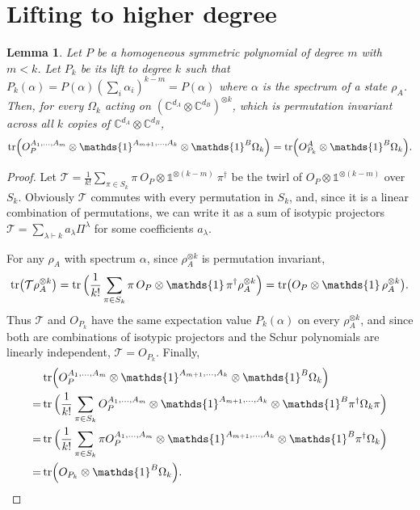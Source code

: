 \documentclass[11pt,a4paper]{report}
\newcommand{\one}{\mathds{1}}
\newcommand{\I}{\one}
\renewcommand{\a}{\alpha}
\newcommand{\C}{\mathds{C}}
\newtheorem{lemma}[theorem]{Lemma}
\begin{document}
\section{Lifting to higher degree}\label{sec:lifting}
\begin{lemma}\label{lem:lifting}
    Let $P$ be a homogeneous symmetric polynomial of degree $m$ with $m < k$. Let $P_k$ be its lift to degree $k$ such that $P_k(\a) = P(\a) \left(\sum_i \a_i \right)^{k-m} = P(\a)$ where $\a$ is the spectrum of a state $\rho_A$.
    Then, for every $\Omega_k$ acting on $(\C^{d_A} \otimes \C^{d_B})^{\otimes k}$, which is permutation invariant across all $k$ copies of $\C^{d_A} \otimes \C^{d_B}$,
    \begin{equation}
        \tr(O_P^{A_1,\dots, A_m} \otimes \I^{A_{m+1}, \dots, A_k} \otimes \I^{B} \Omega_k) = \tr(O_{P_k}^A \otimes \I^B \Omega_k).
    \end{equation}
\end{lemma}
\begin{proof}
    Let $\mathcal{T} = \frac{1}{k!}\sum_{\pi \in S_k} \pi \ O_P \otimes \I^{\otimes (k-m)} \ \pi^\dagger$ be the twirl of $O_P \otimes \I^{\otimes (k-m)}$ over $S_k$. Obviously $\mathcal{T}$ commutes with every permutation in $S_k$, and, since it is a linear combination of permutations, we can write it as a sum of isotypic projectors $\mathcal{T} = \sum_{\lambda \vdash k} a_\lambda \Pi^\lambda$ for some coefficients $a_\lambda$.

    For any $\rho_A$ with spectrum $\a$, since $\rho_A^{\otimes k}$ is permutation invariant,
    \begin{equation}
        \tr(\mathcal{T}\rho_A^{\otimes k}) = \tr\Big(\frac{1}{k!} \sum_{\pi \in S_k} \pi\, O_P \otimes \I\, \pi^\dagger \rho_A^{\otimes k}\Big)= \tr(O_P \otimes \I\, \rho_A^{\otimes k}).
    \end{equation}
    Thus $\mathcal{T}$ and $O_{P_k}$ have the same expectation value $P_k(\a)$ on every $\rho_A^{\otimes k}$, and since both are combinations of isotypic projectors and the Schur polynomials are linearly independent, $\mathcal{T} = O_{P_k}$.
    Finally,
    \begin{align}
        &\tr(O_P^{A_1,\dots, A_m} \otimes \I^{A_{m+1}, \dots, A_k} \otimes \I^{B} \Omega_k)\\
        =& \tr\Big( \frac{1}{k!}\sum_{\pi \in S_k} O_P^{A_1,\dots, A_m} \otimes \I^{A_{m+1}, \dots, A_k} \otimes \I^{B} \pi^\dagger \Omega_k \pi\Big)\\
        =& \tr\Big( \frac{1}{k!}\sum_{\pi \in S_k}  \pi O_P^{A_1,\dots, A_m} \otimes \I^{A_{m+1}, \dots, A_k} \otimes \I^{B} \pi^\dagger \Omega_k\Big)\\
        =& \tr( O_{P_k} \otimes \I^{B} \Omega_k).
    \end{align}
\end{proof}
\end{document}

